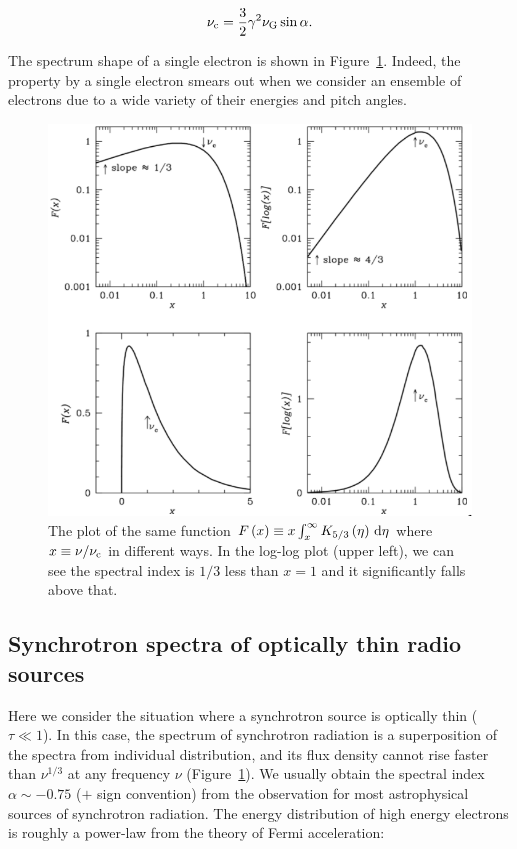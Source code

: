 \begin{equation}\label{eq:essential_radio5n67}
    \nu_{\mathrm{c}} = \frac{3}{2} \gamma^2 \nu_{\mathrm{G}} \sin \alpha.
\end{equation}

The spectrum shape of a single electron is shown in Figure~\ref{fig:nrao_radio5n6}.
Indeed, the property by a single electron smears out when we consider an ensemble of electrons due to a wide variety of their energies and pitch angles.

\begin{figure}[htbp]
	\centering
	\includegraphics[width=\linewidth]{Chapter_2/Figures/NRAO_radio5n6.png}
    \caption[The synchrotron spectrum of a single electron]{\label{fig:nrao_radio5n6}
        The plot of the same function $F\left(x\right) \equiv x\int^{\infty}_x K_{5/3}\left(\eta\right)\,\mathrm{d}\eta$ where $x \equiv \nu / \nu_{\mathrm{c}}$ in different ways.
        In the log-log plot (upper left), we can see the spectral index is $1/3$ less than $x=1$ and it significantly falls above that.
    }
\end{figure}



\subsection{Synchrotron spectra of optically thin radio sources}\label{subsec:synchrotronspectra_opticallythin}
Here we consider the situation where a synchrotron source is optically thin ($\tau \ll 1$).
In this case, the spectrum of synchrotron radiation is a superposition of the spectra from individual distribution, and its flux density cannot rise faster than $\nu^{1/3}$ at any frequency $\nu$ (Figure~\ref{fig:nrao_radio5n6}).
We usually obtain the spectral index $\alpha\sim-0.75$ ($+$ sign convention) from the observation for most astrophysical sources of synchrotron radiation.
The energy distribution of high energy electrons is roughly a power-law from the theory of Fermi acceleration:

